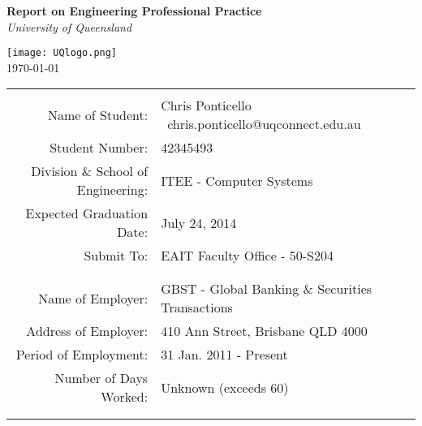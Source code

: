 \documentclass[a4paper]{report}
\begin{document}
\thispagestyle{empty}
\begin{titlepage}
\begin{center}

\vspace{1 cm}
\huge\textbf{Report on Engineering Professional Practice} \\
\vspace{0.5 cm}
\huge\textit{University of Queensland} \\
\vspace{0.5 cm}

\texttt{[image: UQlogo.png]}
\vspace{0.5 cm}\\
\large \today \\
\vspace{0.5 cm}

\begin{table}[ht]
	\center
	\begin{tabular}{r l}
	\\
	\hline
	\\
	Name of Student: & Chris Ponticello \textbar \ 
		chris.ponticello@uqconnect.edu.au \\
	Student Number: & 42345493 \\
	Division \& School of Engineering: & ITEE - Computer Systems \\
	Expected Graduation Date: & July 24, 2014 \\
	Submit To: & EAIT Faculty Office - 50-S204 \\
	\\
	\hline
	\\
	Name of Employer: & GBST - Global Banking \& Securities Transactions \\
	Address of Employer: & 410 Ann Street, Brisbane QLD 4000 \\
	Period of Employment: & 31 Jan. 2011 - Present\\
	Number of Days Worked: & Unknown (exceeds 60)\footnotemark[1]\\
	\\
	\hline
	\\
	\end{tabular}
\end{table} 


\end{center}
\end{titlepage}
\end{document}
